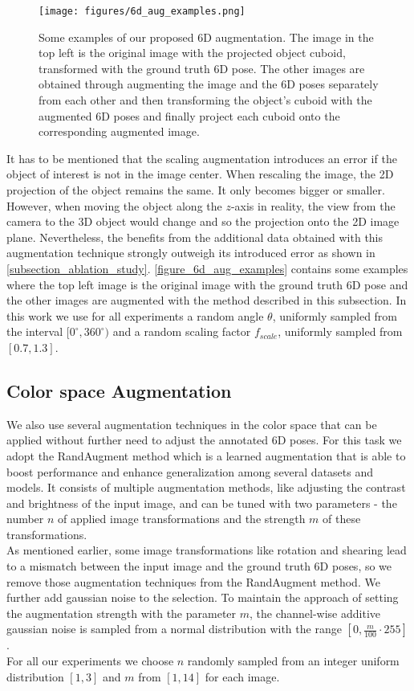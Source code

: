 \documentclass[twocolumn, 10pt, letterpaper]{article}
\begin{document}
\begin{figure}
\texttt{[image: figures/6d\_aug\_examples.png]}
\caption{Some examples of our proposed 6D augmentation. The image in the top left is the original image with the projected object cuboid, transformed with the ground truth 6D pose. The other images are obtained through augmenting the image and the 6D poses separately from each other and then transforming the object's cuboid with the augmented 6D poses and finally project each cuboid onto the corresponding augmented image.}
\label{figure_6d_aug_examples}
\end{figure}

It has to be mentioned that the scaling augmentation introduces an error if the object of interest is not in the image center. When rescaling the image, the 2D projection of the object remains the same. It only becomes bigger or smaller. However, when moving the object along the $z$-axis in reality, the view from the camera to the 3D object would change and so the projection onto the 2D image plane. Nevertheless, the benefits from the additional data obtained with this augmentation technique strongly outweigh its introduced error as shown in \autoref{subsection_ablation_study}. \autoref{figure_6d_aug_examples} contains some examples where the top left image is the original image with the ground truth 6D pose and the other images are augmented with the method described in this subsection. In this work we use for all experiments a random angle $\theta$, uniformly sampled from the interval $[0^{\circ}, 360^{\circ})$ and a random scaling factor $f_{scale}$, uniformly sampled from $[0.7, 1.3]$.

\subsection{Color space Augmentation}
\label{subsection_colorspace_augmentation}
We also use several augmentation techniques in the color space that can be applied without further need to adjust the annotated 6D poses. For this task we adopt the RandAugment\cite{RandAugment} method which is a learned augmentation that is able to boost performance and enhance generalization among several datasets and models. It consists of multiple augmentation methods, like adjusting the contrast and brightness of the input image, and can be tuned with two parameters - the number $n$ of applied image transformations and the strength $m$ of these transformations.\\
As mentioned earlier, some image transformations like rotation and shearing lead to a mismatch between the input image and the ground truth 6D poses, so we remove those augmentation techniques from the RandAugment method. We further add gaussian noise to the selection. To maintain the approach of setting the augmentation strength with the parameter $m$, the channel-wise additive gaussian noise is sampled from a normal distribution with the range $[0, \frac{m}{100} \cdot 255]$.\\
For all our experiments we choose $n$ randomly sampled from an integer uniform distribution $[1, 3]$ and $m$ from $[1, 14]$ for each image.
\end{document}
